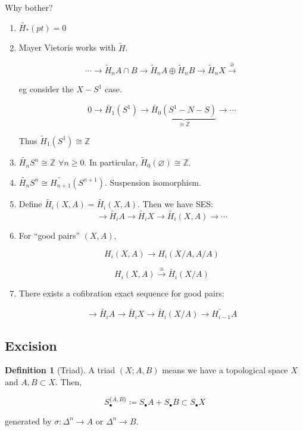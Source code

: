 \documentclass{article}
\theoremstyle{definition}
\newtheorem*{definition}{Definition}
\begin{document}
    Why bother?

    \begin{enumerate}[label=\roman*)]
        \item \(\widetilde{H_{\ast}}(p t) = 0\)
        \item Mayer Vietoris works with \(\widetilde{H}\).
        
        \[
            \cdots \to \widetilde{H}_n A \cap B \to \widetilde{H}_n A \oplus \widetilde{H}_n B \to \widetilde{H}_n X \xrightarrow{\partial}
        \]

        eg consider the \(X - S^1\) case.
        
        \[
            0 \to \widetilde{H_1} (S^1) \to \underbrace{\widetilde{H_0}(S^1 - N - S)}_{\cong\mathbb{Z} } \to \cdots  
        \]

        Thus \(\widetilde{H}_1(S^1)\cong \mathbb{Z}\)

        \item \(\widetilde{H_n}S^n \cong \mathbb{Z}\) \(\forall n\geq 0\). In particular, \(\widetilde{H}_0(\varnothing) \cong \mathbb{Z}\).
        \item \(\widetilde{H_n} S^n \cong \widetilde{H_{n+1}} (S^{n+1})\). Suspension isomorphism.
        \item Define \(\widetilde{H_i}(X,A) = \widetilde{H_i} (X,A)\). Then we have SES:
        \[
            \to \widetilde{H_i} A \to \widetilde{H_i} X \to \widetilde{H_i} (X,A) \to \cdots 
        \]
        \item For ``good pairs'' \((X,A)\), 
        
        \[
            H_i(X,A) \to H_i(X / A, A / A)
        \]

        \[
            H_i(X,A) \xrightarrow{\cong} \widetilde{H_i}(X / A) 
        \]

        \item There exists a cofibration exact sequence for good pairs:
        
        \[
            \to \widetilde{H_i} A \to \widetilde{H_i} X \to \widetilde{H_i} (X / A) \to \widetilde{H_{i-1}}A 
        \]
    \end{enumerate} 

    \subsection*{Excision}

    \begin{definition}
        [Triad] A triad \((X;A,B)\) means we have a topological space \(X\) and \(A,B \subset X\). Then,

        \[
            S_\bullet^{\{ A, B\}} \coloneqq S_\bullet A + S_\bullet B \subset S_\bullet X
        \]

        generated by \(\sigma: \Delta^n \to A\) or \(\Delta^n \to B\).
    \end{definition}
\end{document}
